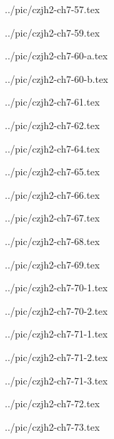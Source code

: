 ../pic/czjh2-ch7-57.tex



../pic/czjh2-ch7-59.tex



../pic/czjh2-ch7-60-a.tex



../pic/czjh2-ch7-60-b.tex



../pic/czjh2-ch7-61.tex



../pic/czjh2-ch7-62.tex



../pic/czjh2-ch7-64.tex



../pic/czjh2-ch7-65.tex



../pic/czjh2-ch7-66.tex



../pic/czjh2-ch7-67.tex



../pic/czjh2-ch7-68.tex



../pic/czjh2-ch7-69.tex



../pic/czjh2-ch7-70-1.tex



../pic/czjh2-ch7-70-2.tex



../pic/czjh2-ch7-71-1.tex



../pic/czjh2-ch7-71-2.tex



../pic/czjh2-ch7-71-3.tex



../pic/czjh2-ch7-72.tex



../pic/czjh2-ch7-73.tex



